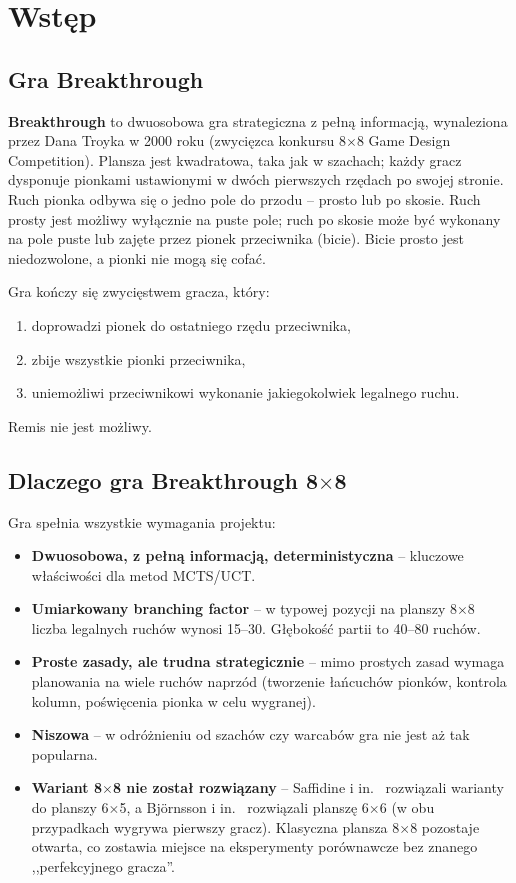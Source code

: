 \section{Wstęp}
\label{sec:wstep}

\subsection{Gra Breakthrough}

\textbf{Breakthrough} to dwuosobowa gra strategiczna z pełną informacją,
wynaleziona przez Dana Troyka w 2000 roku (zwycięzca konkursu 8$\times$8 Game
Design Competition). Plansza jest kwadratowa, taka jak w szachach; każdy gracz
dysponuje pionkami ustawionymi w dwóch pierwszych rzędach po swojej stronie.
Ruch pionka odbywa się o jedno pole do przodu -- prosto lub po skosie. Ruch
prosty jest możliwy wyłącznie na puste pole; ruch po skosie może być wykonany
na pole puste lub zajęte przez pionek przeciwnika (bicie). Bicie prosto jest
niedozwolone, a pionki nie mogą się cofać.

Gra kończy się zwycięstwem gracza, który:
\begin{enumerate}[nosep]
    \item doprowadzi pionek do ostatniego rzędu przeciwnika,
    \item zbije wszystkie pionki przeciwnika,
    \item uniemożliwi przeciwnikowi wykonanie jakiegokolwiek legalnego ruchu.
\end{enumerate}
Remis nie jest możliwy.

\subsection{Dlaczego gra Breakthrough 8$\times$8}

Gra spełnia wszystkie wymagania projektu:
\begin{itemize}[nosep]
    \item \textbf{Dwuosobowa, z pełną informacją, deterministyczna} -- kluczowe
          właściwości dla metod MCTS/UCT.
    \item \textbf{Umiarkowany branching factor} -- w typowej pozycji na planszy
          8$\times$8 liczba legalnych ruchów wynosi 15--30. Głębokość partii to
          40--80 ruchów.
    \item \textbf{Proste zasady, ale trudna strategicznie} -- mimo prostych
          zasad wymaga planowania na wiele ruchów naprzód (tworzenie łańcuchów
          pionków, kontrola kolumn, poświęcenia pionka w celu wygranej).
    \item \textbf{Niszowa} -- w odróżnieniu od szachów czy warcabów gra nie jest
          aż tak popularna.
    \item \textbf{Wariant 8$\times$8 nie został rozwiązany} -- Saffidine i in.\
          \cite{saffidine2011solving} rozwiązali warianty do planszy 6$\times$5,
          a Björnsson i in.\ \cite{bjornsson2026solving} rozwiązali planszę
          6$\times$6 (w obu przypadkach wygrywa pierwszy gracz). Klasyczna
          plansza 8$\times$8 pozostaje otwarta, co zostawia miejsce na
          eksperymenty porównawcze bez znanego ,,perfekcyjnego gracza''.
\end{itemize}

